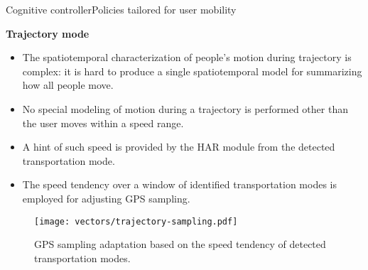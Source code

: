 \begin{frame}{Cognitive controller}{Policies tailored for user mobility}
\small 
\begin{block}{\small \textbf{Trajectory mode}}
\begin{itemize}
    \item The spatiotemporal characterization of people's motion during trajectory is complex: it is hard to produce a single spatiotemporal model for summarizing how all people move.
    \item No special modeling of motion during a trajectory is performed other than the user moves within a speed range.
    \item A hint of such speed is provided by the HAR module from the detected transportation mode.
    \item The speed tendency over a window of identified transportation modes is employed for adjusting GPS sampling.
\end{itemize}
\end{block}

\begin{figure}
  \centering
  \texttt{[image: vectors/trajectory-sampling.pdf]}
  \caption{GPS sampling adaptation based on the speed tendency of detected transportation modes.}
\end{figure}
\end{frame}

